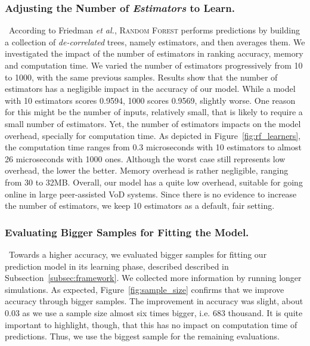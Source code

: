 \subsubsection{Adjusting the Number of \emph{Estimators} to Learn.}

\ According to Friedman \emph{et al.}, \textsc{Random Forest} performs predictions by building a collection of \emph{de-correlated} trees, namely estimators, and then averages them. We investigated the impact of the number of estimators in ranking accuracy, memory and computation time. We varied the number of estimators progressively from 10 to 1000, with the same previous samples. Results show that the number of estimators has a negligible impact in the accuracy of our model. While a model with 10 estimators scores 0.9594, 1000 scores 0.9569, slightly worse. One reason for this might be the number of inputs, relatively small, that is likely to require a small number of estimators. Yet, the number of estimators impacts on the model overhead, specially for computation time. As depicted in Figure~\ref{fig:rf_learners}, the computation time ranges from 0.3 microseconds with 10 estimators to almost 26 microseconds with 1000 ones. Although the worst case still represents low overhead, the lower the better. Memory overhead is rather negligible, ranging from 30 to 32MB. Overall, our model has a quite low overhead, suitable for going online in large peer-assisted VoD systems. Since there is no evidence to increase the number of estimators, we keep 10 estimators as a default, fair setting.

\subsubsection{Evaluating Bigger Samples for Fitting the Model.}

\ Towards a higher accuracy, we evaluated bigger samples for fitting our prediction model in its learning phase, described described in Subsection~\ref{subsec:framework}. We collected more information by running longer simulations. As expected, Figure~\ref{fig:sample_size} confirms that we improve accuracy through bigger samples. The improvement in accuracy was slight, about 0.03 as we use a sample size almost six times bigger, i.e. 683 thousand. It is quite important to highlight, though, that this has no impact on computation time of predictions. Thus, we use the biggest sample for the remaining evaluations.

